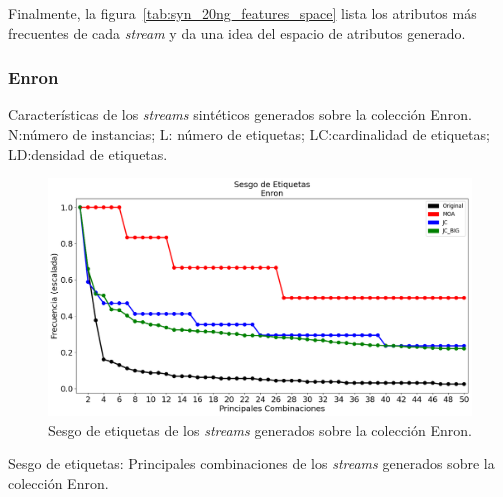 Finalmente, la figura~\ref{tab:syn_20ng_features_space} lista los atributos más
frecuentes de cada \textit{stream} y da una idea del espacio de atributos
generado.

\subsubsection{Enron}

\begin{table}[htbp]
	\centering
	\begin{adjustbox}{max width=\textwidth}
		
	\end{adjustbox}
	\caption[Características de los \textit{streams} sintéticos generados sobre
		la colección Enron.]{Características de los \textit{streams} sintéticos
		generados sobre la colección Enron.  N:\@ número de instancias; L:\@
		número de etiquetas; LC:\@ cardinalidad de etiquetas; LD:\@ densidad de
		etiquetas.}
	\label{tab:syn_enron_stats}
\end{table}

\begin{figure}[htbp]
	\includegraphics[width=\linewidth]{figures/experiments/syn/enron/label_skew.png}
	\caption{Sesgo de etiquetas de los \textit{streams} generados sobre la colección
		Enron.}
	\label{fig:syn_enron_label_skew}
\end{figure}

\begin{table}[htbp]
	\centering
	\begin{adjustbox}{max width=\textwidth}
		
	\end{adjustbox}
	\caption{Sesgo de etiquetas: Principales combinaciones de los
		\textit{streams} generados sobre la colección Enron.}
	\label{tab:syn_enron_top_labels_combinations}
\end{table}

